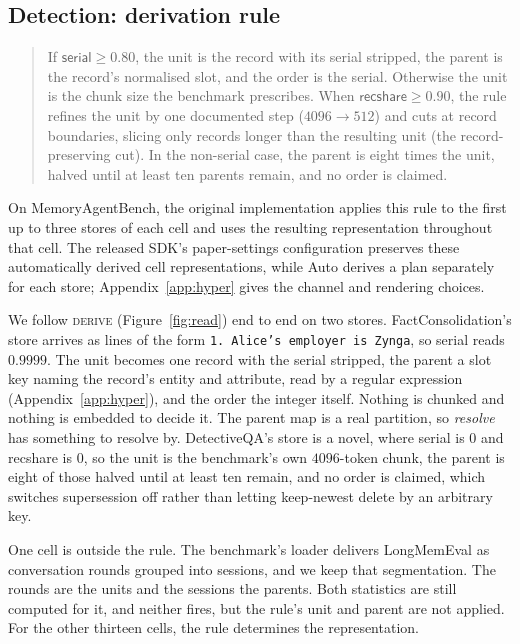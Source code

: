 \documentclass{article}
\newcommand{\serial}{\textsf{serial}}
\newcommand{\cov}{\textsf{recshare}}
\begin{document}
\subsection{Detection: derivation rule}\label{sec:rule}

\begin{quote}
If $\serial \ge 0.80$, the unit is the record with its serial stripped, the parent is the record's
normalised slot, and the order is the serial. Otherwise the unit is the chunk size the benchmark
prescribes. When $\cov \ge 0.90$, the rule refines the unit by one documented step ($4096\to512$)
and cuts at record boundaries, slicing only records longer than the resulting unit (the record-preserving cut).
In the non-serial case, the parent is eight times the unit, halved until at least ten parents remain, and
no order is claimed.
\end{quote}

On MemoryAgentBench, the original implementation applies this rule to the first up to three stores of each cell and uses the resulting representation throughout that cell. The released SDK's paper-settings configuration preserves these automatically derived cell representations, while Auto derives a plan separately for each store; Appendix~\ref{app:hyper} gives the channel and rendering choices.

We follow \textsc{derive} (Figure~\ref{fig:read}) end to end on two stores. FactConsolidation's store arrives as
lines of the form \texttt{1. Alice's employer is Zynga}, so \serial{} reads $0.9999$. The unit becomes one
record with the serial stripped, the parent a slot key naming the record's entity and attribute, read by a
regular expression (Appendix~\ref{app:hyper}), and the order the integer itself. Nothing is chunked and nothing is embedded to decide it. The parent map is a real
partition, so \emph{resolve} has something to resolve by. DetectiveQA's store is a novel, where \serial{}
is $0$ and \cov{} is $0$, so the unit is the benchmark's own $4096$-token chunk, the parent is eight of those
halved until at least ten remain, and no order is claimed, which switches supersession off rather than
letting keep-newest delete by an arbitrary key.

One cell is outside the rule. The benchmark's loader delivers LongMemEval as conversation rounds grouped
into sessions, and we keep that segmentation. The rounds are the units and the sessions the parents. Both
statistics are still computed for it, and neither fires, but the rule's unit and parent are not applied.
For the other thirteen cells, the rule determines the representation.
\end{document}
